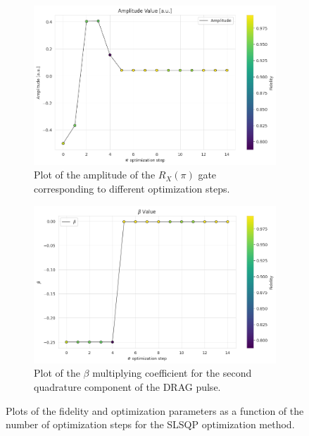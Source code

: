 \begin{figure}[h]
    \begin{subfigure}[t]{0.45\textwidth}
        \includegraphics[width=\textwidth]{figures/png/RB_optimization/SLSQP/amplitude.png}
        \caption{Plot of the amplitude of the $R_X(\pi)$ gate corresponding to different optimization steps.}
        \label{fig:SLSQP:amplitude}
    \end{subfigure}
    \hfill
    \begin{subfigure}[t]{0.45\textwidth}
        \includegraphics[width=\textwidth]{figures/png/RB_optimization/SLSQP/beta.png}
        \caption{Plot of the $\beta$ multiplying coefficient for the second quadrature component of the DRAG pulse.}
        \label{fig:SLSQP:beta}
    \end{subfigure}

    \caption{Plots of the fidelity and optimization parameters as a function of the number of optimization steps for the SLSQP optimization method.}
    \label{fig:SLSQP_plots}
\end{figure}

